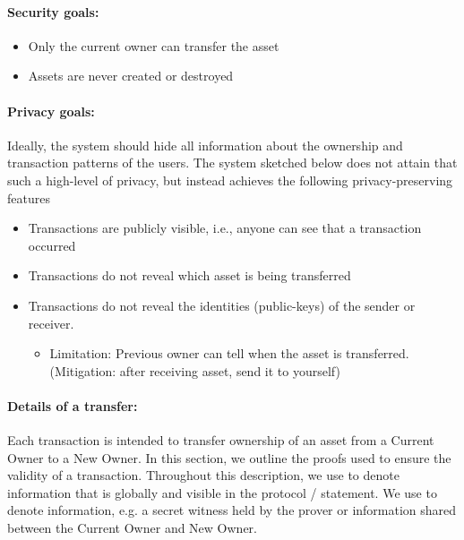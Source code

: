 \paragraph{Security goals:}
  \begin{itemize} 
		\item Only the current owner can transfer the asset
    \item Assets are never created or destroyed
	\end{itemize}

\paragraph{Privacy goals:} 
Ideally, the system should hide all information about the ownership and transaction patterns of the users.
The system sketched below does not attain that such a high-level of privacy, but instead achieves the following privacy-preserving features
   \begin{itemize}
		\item Transactions are publicly visible, i.e., anyone can see that a transaction occurred
    \item Transactions do not reveal which asset is being transferred
    \item Transactions do not reveal the identities (public-keys) of the sender or receiver.
			\begin{itemize}
        \item Limitation: Previous owner can tell when the asset is transferred.  (Mitigation: after receiving asset, send it to yourself)
			\end{itemize}
	\end{itemize}



\paragraph{Details of a transfer:}

	Each transaction is intended to transfer ownership of an asset from a Current Owner to a New Owner.  
	In this section, we outline the proofs used to ensure the validity of a transaction. 
	Throughout this description, we use  to denote information that is globally and  visible in the protocol / statement.  
	We use  to denote  information, e.g. a secret witness held by the prover or information shared between the Current Owner and New Owner.

